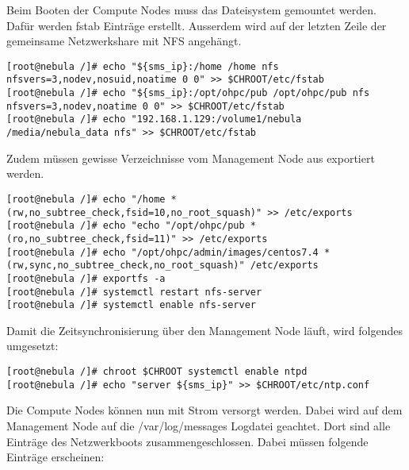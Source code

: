 Beim Booten der Compute Nodes muss das Dateisystem gemountet werden. Dafür werden fstab Einträge erstellt. Ausserdem wird auf der letzten Zeile der gemeinsame Netzwerkshare mit NFS angehängt.

\begin{lstlisting}
[root@nebula /]# echo "${sms_ip}:/home /home nfs nfsvers=3,nodev,nosuid,noatime 0 0" >> $CHROOT/etc/fstab
[root@nebula /]# echo "${sms_ip}:/opt/ohpc/pub /opt/ohpc/pub nfs nfsvers=3,nodev,noatime 0 0" >> $CHROOT/etc/fstab
[root@nebula /]# echo "192.168.1.129:/volume1/nebula /media/nebula_data nfs" >> $CHROOT/etc/fstab
\end{lstlisting}

Zudem müssen gewisse Verzeichnisse vom Management Node aus exportiert werden.

\begin{lstlisting}
[root@nebula /]# echo "/home *(rw,no_subtree_check,fsid=10,no_root_squash)" >> /etc/exports
[root@nebula /]# echo "echo "/opt/ohpc/pub *(ro,no_subtree_check,fsid=11)" >> /etc/exports
[root@nebula /]# echo "/opt/ohpc/admin/images/centos7.4 *(rw,sync,no_subtree_check,no_root_squash)" /etc/exports
[root@nebula /]# exportfs -a
[root@nebula /]# systemctl restart nfs-server
[root@nebula /]# systemctl enable nfs-server
\end{lstlisting}

Damit die Zeitsynchronisierung über den Management Node läuft, wird folgendes umgesetzt:

\begin{lstlisting}
[root@nebula /]# chroot $CHROOT systemctl enable ntpd
[root@nebula /]# echo "server ${sms_ip}" >> $CHROOT/etc/ntp.conf
\end{lstlisting}

Die Compute Nodes können nun mit Strom versorgt werden. Dabei wird auf dem Management Node auf die /var/log/messages Logdatei geachtet. Dort sind alle Einträge des Netzwerkboots zusammengeschlossen. Dabei müssen folgende Einträge erscheinen:

